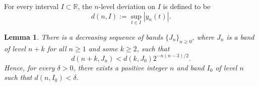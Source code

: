 \documentclass{amsart}
\newtheorem{lemm}[thm]{Lemma}
\theoremstyle{definition}
\begin{document}

For every interval $I\subset \mathbb{R}$,
the $n$-level deviation on $I$ is defined to be
 $$d(n,I):=\sup_{t\in I}|y_{n}(t)|.$$

\begin{lemm}\label{smalldevi}
There is a decreasing sequence of bands $\{J_n\}_{n\ge0}$,
where $J_n$ is a band of level $n+k$ for all $n\ge1$ and some $k\ge2$,  such that
$$d(n+k,J_{n})<d(k,J_0)2^{-n(n-3)/2}.$$
Hence, for every $\delta>0$, there exists a positive integer $n$
and band $I_0$ of level $n$ such that $d(n,I_0)<\delta$.
\end{lemm}
\end{document}
